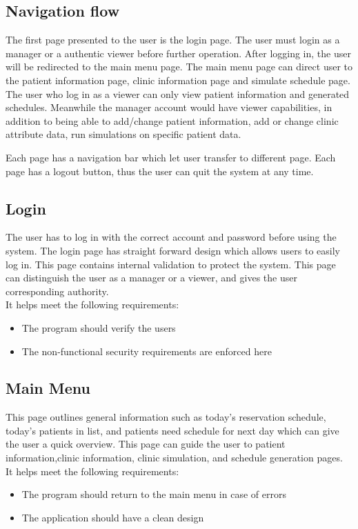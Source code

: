 \documentclass[12pt]{article}
\begin{document}
\subsection{Navigation flow}
The first page presented to the user is the login page. The user must login as a manager or a authentic viewer before further operation. After logging in, the user will be redirected to the main menu page. The main menu page can direct user to the patient information page, clinic information page and simulate schedule page. The user who log in as a viewer can only view patient information and generated schedules. Meanwhile the manager account would have viewer capabilities, in addition to being able to add/change patient information, add or change clinic attribute data, run simulations on specific patient data.

\noindent \newline
Each page has a navigation bar which let user transfer to different page. Each page has a logout button, thus the user can quit the system at any time.

\subsection{Login}
The user has to log in with the correct account and password before using the system. The login page has straight forward design which allows users to easily log in. This page contains internal validation to protect the system. This page can distinguish the user as a manager or a viewer, and gives the user corresponding authority. 
 \\
It helps meet the following requirements:
\begin{itemize}
	\item The program should verify the users
	\item The non-functional security requirements are enforced here
\end{itemize} 

\subsection{Main Menu}
This page outlines general information such as today’s reservation schedule, today’s patients in list, and patients need schedule for next day which can give the user a quick overview. This page can guide the user to patient information,clinic information, clinic simulation, and schedule generation pages. \\
It helps meet the following requirements:
\begin{itemize}
	\item The program should return to the main menu in case of errors
	\item The application should have a clean design
\end{itemize}
\end{document}
